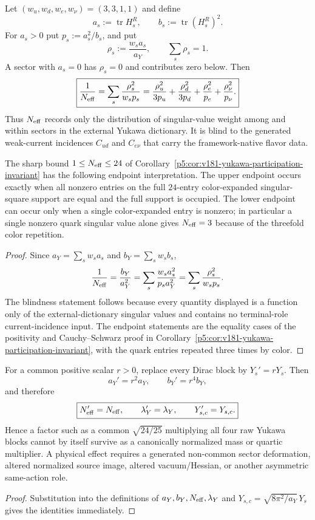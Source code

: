 \documentclass[12pt,a4paper]{article}
\begin{document}
\begin{corollary}
\label{p5:cor:v355-yukawa-projective-participation}
Let $(w_u,w_d,w_e,w_\nu)=(3,3,1,1)$ and define
\[
 a_s:=\operatorname{tr}H_s^R,\qquad
 b_s:=\operatorname{tr}(H_s^R)^2.
\]
For $a_s>0$ put $p_s:=a_s^2/b_s$, and put
\[
 \rho_s:=\frac{w_sa_s}{a_Y},\qquad \sum_s\rho_s=1.
\]
A sector with $a_s=0$ has $\rho_s=0$ and contributes zero below.  Then
\[
 \boxed{
 \frac1{N_{\rm eff}}
 =\sum_s\frac{\rho_s^2}{w_sp_s}
 =\frac{\rho_u^2}{3p_u}+\frac{\rho_d^2}{3p_d}
  +\frac{\rho_e^2}{p_e}+\frac{\rho_\nu^2}{p_\nu}.}
\]
Thus $N_{\rm eff}$ records only the distribution of singular-value weight
among and within sectors in the external Yukawa dictionary.  It is blind to
the generated weak-current incidences $C_{ud}$ and $C_{e\nu}$ that carry the
framework-native flavor data.

The sharp bound $1\le N_{\rm eff}\le24$ of
Corollary~\ref{p5:cor:v181-yukawa-participation-invariant} has the following
endpoint interpretation.  The upper endpoint occurs exactly when all
nonzero entries on the full $24$-entry color-expanded singular-square support
are equal and the full support is occupied.  The lower endpoint can occur
only when a single color-expanded entry is nonzero; in particular a single
nonzero quark singular value alone gives $N_{\rm eff}=3$ because of the
threefold color repetition.
\end{corollary}
\begin{proof}
Since $a_Y=\sum_sw_sa_s$ and $b_Y=\sum_sw_sb_s$,
\[
 \frac1{N_{\rm eff}}=\frac{b_Y}{a_Y^2}
 =\sum_s\frac{w_sa_s^2}{p_sa_Y^2}
 =\sum_s\frac{\rho_s^2}{w_sp_s}.
\]
The blindness statement follows because every quantity displayed is a
function only of the external-dictionary singular values and contains no
terminal-role current-incidence input.  The endpoint statements are the
equality cases of the positivity and Cauchy--Schwarz proof in
Corollary~\ref{p5:cor:v181-yukawa-participation-invariant}, with the quark
entries repeated three times by color.
\end{proof}

\begin{corollary}
\label{p5:cor:v355-common-yukawa-scale-cancellation}
For a common positive scalar $r>0$, replace every Dirac block by
$Y_s' = rY_s$.  Then
\[
 a_Y'=r^2a_Y,\qquad b_Y'=r^4b_Y,
\]
and therefore
\[
 \boxed{
 N_{\rm eff}'=N_{\rm eff},\qquad
 \lambda_Y'=\lambda_Y,\qquad
 Y_{s,c}'=Y_{s,c}.}
\]
Hence a factor such as a common $\sqrt{24/25}$ multiplying all four raw
Yukawa blocks cannot by itself survive as a canonically normalized mass or
quartic multiplier.  A physical effect requires a generated non-common
sector deformation, altered normalized source image, altered vacuum/Hessian,
or another asymmetric same-action role.
\end{corollary}
\begin{proof}
Substitution into the definitions of $a_Y,b_Y,N_{\rm eff},\lambda_Y$ and
$Y_{s,c}=\sqrt{8\pi^2/a_Y}\,Y_s$ gives the identities immediately.
\end{proof}
\end{document}
